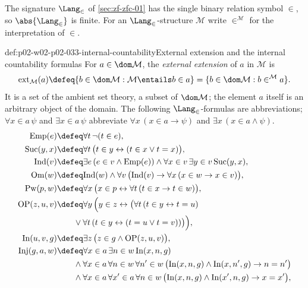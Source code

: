 The signature \(\Lang_{\in}\) of \cref{sec:zf-zfc-01} has the single binary
relation symbol \(\in\), so \(\abs{\Lang_{\in}}\) is finite.  For an
\(\Lang_{\in}\)-structure \(\mathcal M\) write \(\in^{\mathcal M}\) for the
interpretation of \(\in\).

\begin{hbdefinition}{def:p02-w02-p02-033-internal-countability}{External extension and the internal countability formulas}
For \(a\in\dom\mathcal M\), the \emph{external extension} of \(a\) in
\(\mathcal M\) is
\[
 \operatorname{ext}_{\mathcal M}(a)
 \defeq
 \{b\in\dom\mathcal M:\mathcal M\entails b\in a\}
 =\{b\in\dom\mathcal M:b\in^{\mathcal M}a\}.
\]
It is a set of the ambient set theory, a subset of \(\dom\mathcal M\); the
element \(a\) itself is an arbitrary object of the domain.  The following
\(\Lang_{\in}\)-formulas are abbreviations; \(\forall x\in a\,\psi\) and
\(\exists x\in a\,\psi\) abbreviate \(\forall x\,(x\in a\to\psi)\) and
\(\exists x\,(x\in a\land\psi)\).
\[
\begin{aligned}
 \mathrm{Emp}(e)&\defeq\forall t\,\neg(t\in e),\\
 \mathrm{Suc}(y,x)&\defeq\forall t\,\bigl(t\in y\leftrightarrow(t\in x\lor t=x)\bigr),\\
 \mathrm{Ind}(v)&\defeq\exists e\,(e\in v\land\mathrm{Emp}(e))\land
   \forall x\in v\,\exists y\in v\,\mathrm{Suc}(y,x),\\
 \mathrm{Om}(w)&\defeq\mathrm{Ind}(w)\land
   \forall v\,\bigl(\mathrm{Ind}(v)\to\forall x\,(x\in w\to x\in v)\bigr),\\
 \mathrm{Pw}(p,w)&\defeq\forall x\,\bigl(x\in p\leftrightarrow
   \forall t\,(t\in x\to t\in w)\bigr),\\
 \mathrm{OP}(z,u,v)&\defeq\forall y\,\Bigl(y\in z\leftrightarrow
   \bigl(\forall t\,(t\in y\leftrightarrow t=u)\\
 &\qquad\lor\forall t\,(t\in y\leftrightarrow(t=u\lor t=v))\bigr)\Bigr),\\
 \mathrm{In}(u,v,g)&\defeq\exists z\,\bigl(z\in g\land\mathrm{OP}(z,u,v)\bigr),\\
 \mathrm{Inj}(g,a,w)&\defeq
   \forall x\in a\,\exists n\in w\,\mathrm{In}(x,n,g)\\
 &\qquad\land\forall x\in a\,\forall n\in w\,\forall n'\in w\,
   \bigl(\mathrm{In}(x,n,g)\land\mathrm{In}(x,n',g)\to n=n'\bigr)\\
 &\qquad\land\forall x\in a\,\forall x'\in a\,\forall n\in w\,
   \bigl(\mathrm{In}(x,n,g)\land\mathrm{In}(x',n,g)\to x=x'\bigr),\\

\end{aligned}\]
\end{hbdefinition}
